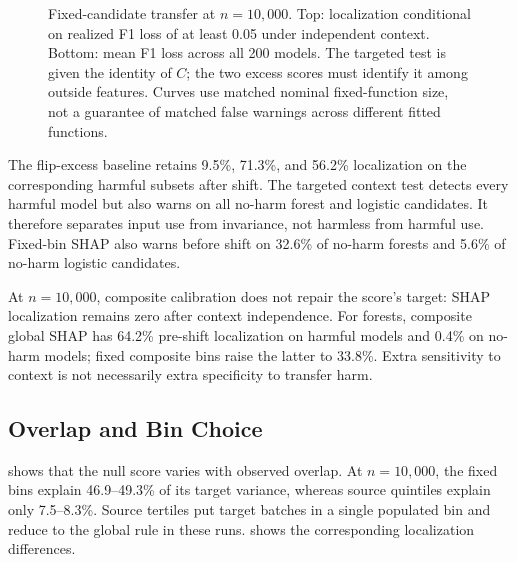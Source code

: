 \documentclass[conference]{IEEEtran}
\begin{document}
\begin{table}[t]
\centering
\caption{Localization (\%) on $N_H$ harm-positive candidates before and after independent-context shift ($\epsilon=0.50$). Mean F1 loss averages all 200 candidates. Both excess scores use fixed-function observed-bin calibration; their self-warning rates are near 5\%, but their independent-model rates differ (see text). The targeted context test localizes all harm-positive candidates in these strata.}
\label{tab:transfer-harm}
\footnotesize

\end{table}

\begin{figure}[t]
\centering

\caption{Fixed-candidate transfer at $n=10{,}000$. Top: localization conditional on realized F1 loss of at least 0.05 under independent context. Bottom: mean F1 loss across all 200 models. The targeted test is given the identity of $C$; the two excess scores must identify it among outside features. Curves use matched nominal fixed-function size, not a guarantee of matched false warnings across different fitted functions.}
\label{fig:transfer-harm}
\end{figure}

The flip-excess baseline retains 9.5\%, 71.3\%, and 56.2\% localization on the corresponding harmful subsets after shift. The targeted context test detects every harmful model but also warns on all no-harm forest and logistic candidates. It therefore separates input use from invariance, not harmless from harmful use. Fixed-bin SHAP also warns before shift on 32.6\% of no-harm forests and 5.6\% of no-harm logistic candidates.

At $n=10{,}000$, composite calibration does not repair the score's target: SHAP localization remains zero after context independence. For forests, composite global SHAP has 64.2\% pre-shift localization on harmful models and 0.4\% on no-harm models; fixed composite bins raise the latter to 33.8\%. Extra sensitivity to context is not necessarily extra specificity to transfer harm.

\subsection{Overlap and Bin Choice}
 shows that the null score varies with observed overlap. At $n=10{,}000$, the fixed bins explain 46.9--49.3\% of its target variance, whereas source quintiles explain only 7.5--8.3\%. Source tertiles put target batches in a single populated bin and reduce to the global rule in these runs.  shows the corresponding localization differences.
\end{document}
